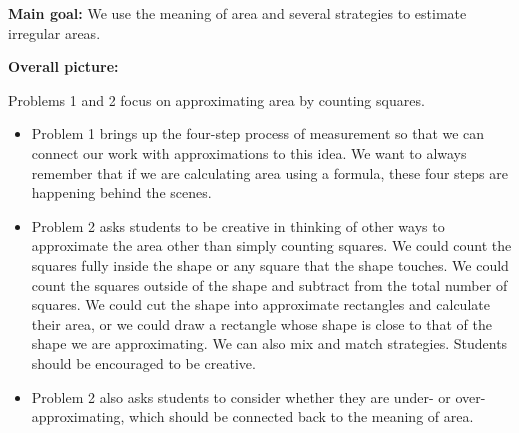 \documentclass[nooutcomes,noauthor, handout]{ximera}
\begin{document}
\begin{instructorNotes} 



{\bf Main goal:} We use the meaning of area and several strategies to estimate irregular areas.

{\bf Overall picture:}


Problems 1 and 2 focus on approximating area by counting squares. 

\begin{itemize}
	\item Problem 1 brings up the four-step process of measurement so that we can connect our work with approximations to this idea. We want to always remember that if we are calculating area using a formula, these four steps are happening behind the scenes.
	\item Problem 2 asks students to be creative in thinking of other ways to approximate the area other than simply counting squares. We could count the squares fully inside the shape or any square that the shape touches. We could count the squares outside of the shape and subtract from the total number of squares. We could cut the shape into approximate rectangles and calculate their area, or we could draw a rectangle whose shape is close to that of the shape we are approximating. We can also mix and match strategies. Students should be encouraged to be creative.
	\item Problem 2 also asks students to consider whether they are under- or over-approximating, which should be connected back to the meaning of area.
\end{itemize}



\end{instructorNotes}
\end{document}
